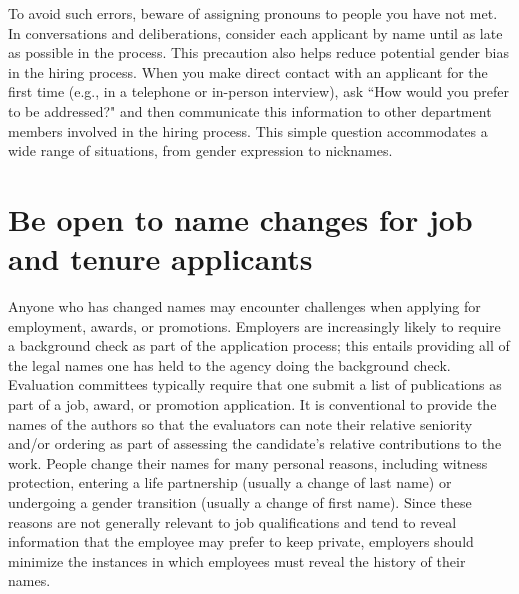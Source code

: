 To avoid such errors, beware of assigning pronouns to people you have not met. In conversations and deliberations, consider each applicant by name until as late as possible in the process. This precaution also helps reduce potential gender bias in the hiring process. When you make direct contact with an applicant for the first time (e.g., in a telephone or in-person interview), ask ``How would you prefer to be addressed?" and then communicate this information to other department members involved in the hiring process. This simple question accommodates a wide range of situations, from gender expression to nicknames.


\section {Be open to name changes for job and tenure applicants}
\label{job-name-change}
Anyone who has changed names may encounter challenges when applying for employment, awards, or promotions. Employers are increasingly likely to require a background check as part of the application process; this entails providing all of the legal names one has held to the agency doing the background check. Evaluation committees typically require that one submit a list of publications as part of a job, award, or promotion application. It is conventional to provide the names of the authors so that the evaluators can note their relative seniority and/or ordering as part of assessing the candidate's relative contributions to the work. People change their names for many personal reasons, including witness protection, entering a life partnership (usually a change of last name) or undergoing a gender transition (usually a change of first name). Since these reasons are not generally relevant to job qualifications and tend to reveal information that the employee may prefer to keep private, employers should minimize the instances in which employees must reveal the history of their names.


